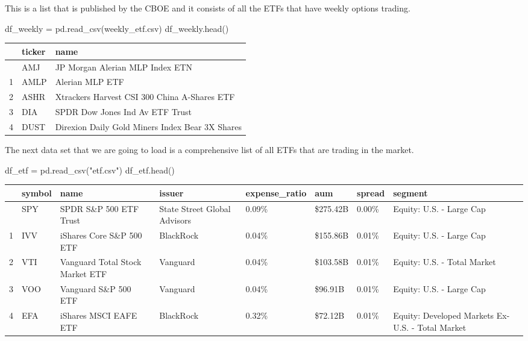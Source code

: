 \documentclass[
  letterpaper,
  DIV=11,
  numbers=noendperiod]{scrreprt}
\newenvironment{Shaded}{\begin{snugshade}}{\end{snugshade}}
\newcommand{\NormalTok}[1]{\textcolor[rgb]{0.00,0.23,0.31}{#1}}
\newcommand{\OperatorTok}[1]{\textcolor[rgb]{0.37,0.37,0.37}{#1}}
\newcommand{\StringTok}[1]{\textcolor[rgb]{0.13,0.47,0.30}{#1}}
\begin{document}
This is a list that is published by the CBOE and it consists of all the
ETFs that have weekly options trading.

\begin{Shaded}
\begin{Highlighting}[]
\NormalTok{df\_weekly }\OperatorTok{=}\NormalTok{ pd.read\_csv(}\StringTok{\textquotesingle{}weekly\_etf.csv\textquotesingle{}}\NormalTok{)}
\NormalTok{df\_weekly.head()}
\end{Highlighting}
\end{Shaded}

\begin{longtable}[]{@{}lll@{}}
\toprule\noalign{}
& ticker & name \\
\midrule\noalign{}
\endhead
\bottomrule\noalign{}
\endlastfoot
0 & AMJ & JP Morgan Alerian MLP Index ETN \\
1 & AMLP & Alerian MLP ETF \\
2 & ASHR & Xtrackers Harvest CSI 300 China A-Shares ETF \\
3 & DIA & SPDR Dow Jones Ind Av ETF Trust \\
4 & DUST & Direxion Daily Gold Miners Index Bear 3X Shares \\
\end{longtable}

The next data set that we are going to load is a comprehensive list of
all ETFs that are trading in the market.

\begin{Shaded}
\begin{Highlighting}[]
\NormalTok{df\_etf }\OperatorTok{=}\NormalTok{ pd.read\_csv(}\StringTok{"etf.csv"}\NormalTok{)}
\NormalTok{df\_etf.head()}
\end{Highlighting}
\end{Shaded}

\begin{longtable}[]{@{}llllllll@{}}
\toprule\noalign{}
& symbol & name & issuer & expense\_ratio & aum & spread & segment \\
\midrule\noalign{}
\endhead
\bottomrule\noalign{}
\endlastfoot
0 & SPY & SPDR S\&P 500 ETF Trust & State Street Global Advisors &
0.09\% & \$275.42B & 0.00\% & Equity: U.S. - Large Cap \\
1 & IVV & iShares Core S\&P 500 ETF & BlackRock & 0.04\% & \$155.86B &
0.01\% & Equity: U.S. - Large Cap \\
2 & VTI & Vanguard Total Stock Market ETF & Vanguard & 0.04\% &
\$103.58B & 0.01\% & Equity: U.S. - Total Market \\
3 & VOO & Vanguard S\&P 500 ETF & Vanguard & 0.04\% & \$96.91B & 0.01\%
& Equity: U.S. - Large Cap \\
4 & EFA & iShares MSCI EAFE ETF & BlackRock & 0.32\% & \$72.12B & 0.01\%
& Equity: Developed Markets Ex-U.S. - Total Market \\
\end{longtable}
\end{document}
